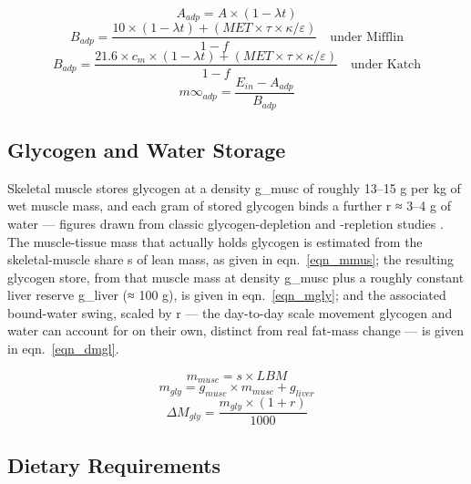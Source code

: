 \begin{equation}
\label{eqn_amta}
A_{adp} = A × (1 − λt)
\end{equation}
\begin{equation}
\label{eqn_bata}
B_{adp} = \frac{10×(1 − λt) + (MET × τ × κ / ε)}{1 − f} \quad \text{under Mifflin}
\end{equation}
\begin{equation}
\label{eqn_batk}
B_{adp} = \frac{21.6×c_{m}×(1 − λt) + (MET × τ × κ / ε)}{1 − f} \quad \text{under Katch}
\end{equation}
\begin{equation}
\label{eqn_mplt}
m∞_{adp} = \frac{E_{in} − A_{adp}}{B_{adp}}
\end{equation}

\subsection{Glycogen and Water Storage}

Skeletal muscle stores glycogen at a density g\_musc of roughly 13–15 g per kg of wet muscle mass, and each gram of stored glycogen binds a further r ≈ 3–4 g of water — figures drawn from classic glycogen-depletion and -repletion studies \cite{ref_olsson1970}. The muscle-tissue mass that actually holds glycogen is estimated from the skeletal-muscle share s of lean mass, as given in eqn.~\eqref{eqn_mmus}; the resulting glycogen store, from that muscle mass at density g\_musc plus a roughly constant liver reserve g\_liver (≈ 100 g), is given in eqn.~\eqref{eqn_mgly}; and the associated bound-water swing, scaled by r — the day-to-day scale movement glycogen and water can account for on their own, distinct from real fat-mass change — is given in eqn.~\eqref{eqn_dmgl}.

\begin{equation}
\label{eqn_mmus}
m_{musc} = s × LBM
\end{equation}
\begin{equation}
\label{eqn_mgly}
m_{gly} = g_{musc} × m_{musc} + g_{liver}
\end{equation}
\begin{equation}
\label{eqn_dmgl}
ΔM_{gly} = \frac{m_{gly} × (1 + r)}{1000}
\end{equation}

\subsection{Dietary Requirements}


